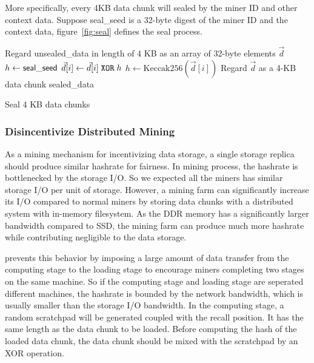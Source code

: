 More specifically, every 4KB data chunk will sealed by the miner ID and other context data. 
%
Suppose {\sf seal\_seed} is a 32-byte digest of the miner ID and the context data, figure~\ref{fig:seal} defines the seal process.
%

\begin{algorithm}
	\small
	\SetNlSty{}{}{}
	\DontPrintSemicolon
	Regard {\sf unsealed\_data} in length of 4 KB as an array of 32-byte elements $\vec{d}$\;
	$h\leftarrow {\sf seal\_seed}$\;
	 {
		$\vec{d}[i]\leftarrow \vec{d}[i]{\;\tt XOR\;} h$\;
		$h\leftarrow \textrm{Keccak256}(\vec{d}[i])$\;
	}
	Regard $\vec{d}$ as a 4-KB data chunk {\sf sealed\_data}\;
	\caption{Seal 4 KB data chunks}
	\label{fig:seal}
	\vspace{-4mm}
\end{algorithm}

\subsubsection{Disincentivize Distributed Mining}

As a mining mechanism for incentivizing data storage, a single storage replica should produce similar hashrate for fairness.
%
In {\sproof} mining process, the hashrate is bottlenecked by the storage I/O. 
%
So we expected all the miners has similar storage I/O per unit of storage. 
%
However, a mining farm can significantly increase its I/O compared to normal miners by storing data chunks with a distributed system with in-memory filesystem.
%
As the DDR memory has a significantly larger bandwidth compared to SSD, the mining farm can produce much more hashrate while contributing negligible to the data storage. 

{\project} prevents this behavior by imposing a large amount of data transfer from the computing stage to the loading stage to encourage miners completing two stages on the same machine. 
%
So if the computing stage and loading stage are seperated different machines, the hashrate is bounded by the network bandwidth, which is usually smaller than the storage I/O bandwidth.
%
In the computing stage, a random scratchpad will be generated coupled with the recall position. 
%
It has the same length as the data chunk to be loaded. 
%
Before computing the hash of the loaded data chunk, the data chunk should be mixed with the scratchpad by an XOR operation.


